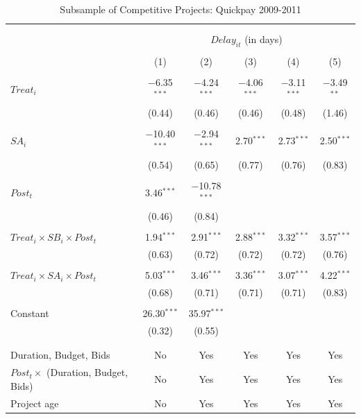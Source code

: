 \documentclass[]{article}
\begin{document}
\begin{table}[H] \centering 
  \caption{Subsample of Competitive Projects: Quickpay 2009-2011} 
  \label{} 
\small 
\begin{tabular}{@{\extracolsep{-2pt}}lccccc} 
\\[-1.8ex]\hline 
\hline \\[-1.8ex] 
\\[-1.8ex] & \multicolumn{5}{c}{$Delay_{it}$ (in days)} \\ 
\\[-1.8ex] & (1) & (2) & (3) & (4) & (5)\\ 
\hline \\[-1.8ex] 
 $Treat_i$ & $-$6.35$^{***}$ & $-$4.24$^{***}$ & $-$4.06$^{***}$ & $-$3.11$^{***}$ & $-$3.49$^{**}$ \\ 
  & (0.44) & (0.46) & (0.46) & (0.48) & (1.46) \\ 
  & & & & & \\ 
 $SA_i$ & $-$10.40$^{***}$ & $-$2.94$^{***}$ & 2.70$^{***}$ & 2.73$^{***}$ & 2.50$^{***}$ \\ 
  & (0.54) & (0.65) & (0.77) & (0.76) & (0.83) \\ 
  & & & & & \\ 
 $Post_t$ & 3.46$^{***}$ & $-$10.78$^{***}$ &  &  &  \\ 
  & (0.46) & (0.84) &  &  &  \\ 
  & & & & & \\ 
 $Treat_i \times SB_i \times Post_t$ & 1.94$^{***}$ & 2.91$^{***}$ & 2.88$^{***}$ & 3.32$^{***}$ & 3.57$^{***}$ \\ 
  & (0.63) & (0.72) & (0.72) & (0.72) & (0.76) \\ 
  & & & & & \\ 
 $Treat_i \times SA_i \times Post_t$ & 5.03$^{***}$ & 3.46$^{***}$ & 3.36$^{***}$ & 3.07$^{***}$ & 4.22$^{***}$ \\ 
  & (0.68) & (0.71) & (0.71) & (0.71) & (0.83) \\ 
  & & & & & \\ 
 Constant & 26.30$^{***}$ & 35.97$^{***}$ &  &  &  \\ 
  & (0.32) & (0.55) &  &  &  \\ 
  & & & & & \\ 
\hline \\[-1.8ex] 
Duration, Budget, Bids & No & Yes & Yes & Yes & Yes \\ 
$Post_t \times $  (Duration, Budget, Bids) & No & Yes & Yes & Yes & Yes \\ 
Project age & No & Yes & Yes & Yes & Yes \\ 

\end{tabular}
\end{table}
\end{document}
